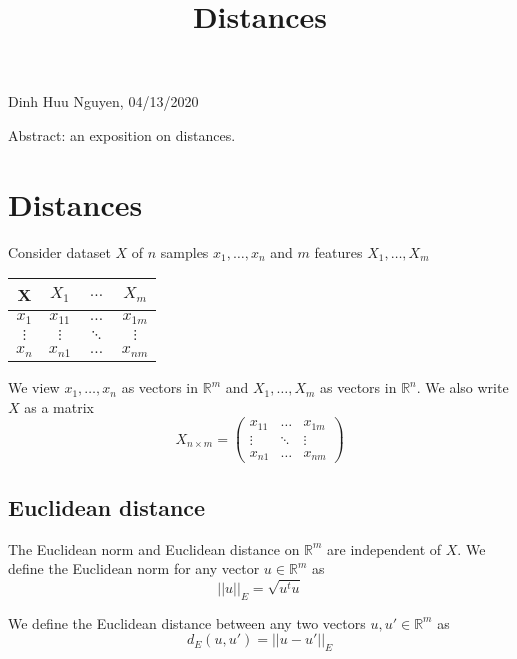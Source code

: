 \documentclass[11pt]{amsart}
\title{Distances}
\theoremstyle{definition}
\begin{document}
\maketitle

\begin{center}
Dinh Huu Nguyen, 04/13/2020
\end{center}
\vspace{20pt}

Abstract: an exposition on distances.

\tableofcontents

\section{Distances} \label{distances} Consider dataset $X$ of $n$ samples $x_1, \dots , x_n$ and $m$ features $X_1, \dots, X_m$
\vspace{10pt}
\begin{center}
\begin{tabular}{c | c c c}
X & $X_1$ & $\dots$ & $X_m$ \\
\hline
$x_1$ & $x_{11}$ & $\dots$ & $x_{1m}$ \\
$\vdots$ & $\vdots$ & $\ddots$ & $\vdots$ \\
$x_n$ & $x_{n1}$ & $\dots$ & $x_{nm}$ \\
\end{tabular}
\end{center}
\vspace{10pt}

We view $x_1, \dots , x_n$ as vectors in $\mathbb{R}^m$ and $X_1, \dots , X_m$ as vectors in $\mathbb{R}^n$. We also write $X$ as a matrix
$$X_{n \times m} = \left( \begin{array}{ccc} x_{11} & \dots & x_{1m} \\ \vdots & \ddots & \vdots \\ x_{n1} & \dots & x_{nm} \end{array} \right)$$

\subsection{Euclidean distance} \label{Euclidean_distance} The Euclidean norm and Euclidean distance on $\mathbb{R}^m$ are independent of $X$.
\dfn We define the Euclidean norm for any vector $u \in \mathbb{R}^m$ as
$$||u||_E = \sqrt{u^t u}$$

\dfn We define the Euclidean distance between any two vectors $u, u' \in \mathbb{R}^m$ as
$$d_E(u, u') = ||u - u'||_E$$
\end{document}
